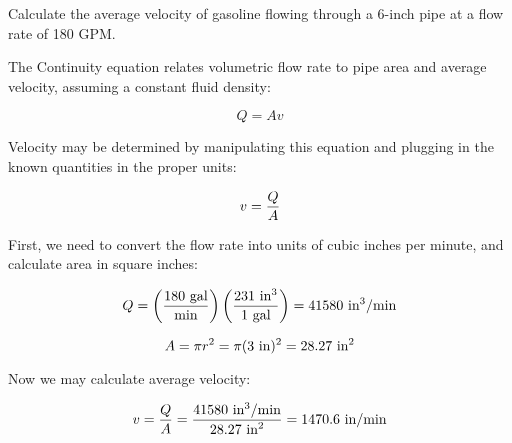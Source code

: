 

Calculate the average velocity of gasoline flowing through a 6-inch pipe at a flow rate of 180 GPM.







The Continuity equation relates volumetric flow rate to pipe area and average velocity, assuming a constant fluid density:

$$Q = A v$$

Velocity may be determined by manipulating this equation and plugging in the known quantities in the proper units:

$$v = {Q \over A}$$

First, we need to convert the flow rate into units of cubic inches per minute, and calculate area in square inches:

$$Q = \left(180 \hbox{ gal} \over \hbox{min} \right) \left(231 \hbox{ in}^3 \over 1 \hbox{ gal} \right) = 41580 \hbox{ in}^3\hbox{/min}$$

$$A = \pi r^2 = \pi (3 \hbox{ in})^2 = 28.27 \hbox{ in}^2$$

Now we may calculate average velocity:

$$v = {Q \over A} = {41580 \hbox{ in}^3\hbox{/min} \over 28.27 \hbox{ in}^2} = 1470.6 \hbox{ in/min}$$











